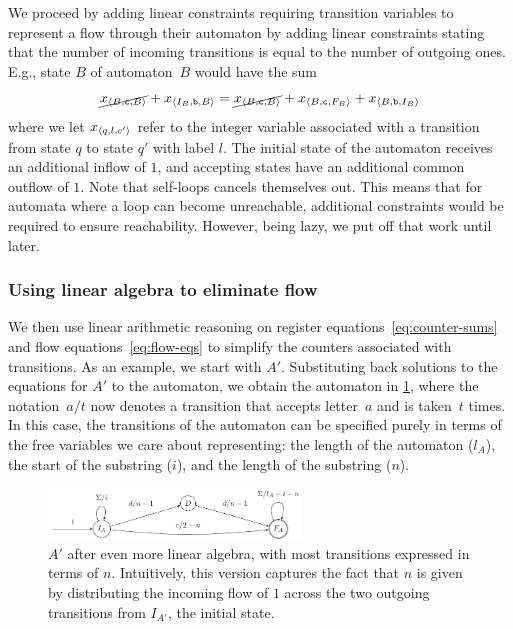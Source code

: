 We proceed by adding linear constraints requiring transition variables to
represent a flow through their automaton by adding linear constraints stating
that the number of incoming transitions is equal to the number of outgoing ones.
E.g., state $B$ of automaton~$B$ would have the sum
%
\begin{equation}\label{eq:flow-eqs}
  \cancel{x_{\left\langle B, \texttt{c}, B\right\rangle}} +
  x_{\left\langle I_B, \texttt{b}, B\right\rangle} = \cancel{x_{\left\langle B, \texttt{c}, B\right\rangle}}  +
  x_{\left\langle B, \texttt{c}, F_B\right\rangle} + x_{\left\langle B, \texttt{b}, I_B\right\rangle}
\end{equation}
%
where we let
$x_{\left\langle q, l, c'\right\rangle}$ refer to the integer variable associated with a
transition from state $q$ to state $q'$ with label $l$. The initial state
of the automaton receives an additional inflow of $1$, and accepting
states have an additional common outflow of $1$. Note that self-loops
cancels themselves out. This means that for automata where a loop can become
unreachable, additional constraints would be required to ensure reachability.
However, being lazy, we put off that work until later.


\subsubsection{Using linear algebra to eliminate flow}\label{sec:intuition:algebra}

We then use linear arithmetic reasoning on register
equations~\eqref{eq:counter-sums} and flow
equations~\eqref{eq:flow-eqs} to simplify the counters associated
with transitions.
As an example, we start with $A'$. Substituting back
solutions to the equations for $A'$ to the automaton, we obtain the
automaton in \cref{fig:a_2}, where the notation~$a / t$ now denotes
a transition that accepts letter~$a$ and is taken~$t$ times.
In this case, the transitions of the automaton
can be specified purely in terms of the free
variables we care about representing:  the length of the automaton ($l_A$), the
start of the substring ($i$), and the length of the substring ($n$).

\begin{figure}[tb]
  \centering 
  \includegraphics[width=0.6\textwidth]{a_2}
  \caption{ $A'$ after even more linear algebra, with most transitions expressed
  in terms of $n$. Intuitively, this version captures the fact that $n$ is given
  by distributing the incoming flow of $1$ across the two outgoing transitions
  from $I_{A'}$, the initial state.}
  \label{fig:a_2}
\end{figure}

